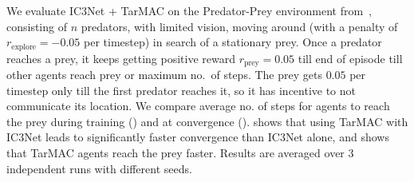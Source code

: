 We evaluate IC3Net + TarMAC on the Predator-Prey environment from~\citet{singh_iclr19},
consisting of $n$ predators, with limited vision, moving around
(with a penalty of $r_{\text{explore}}=-0.05$ per timestep)
in search of a stationary prey. Once a predator reaches a prey, it keeps getting positive
reward $r_{\text{prey}}=0.05$ till end of episode \ie till other agents reach prey or
maximum no.~of steps. The prey gets $0.05$ per timestep only till the first
predator reaches it, so it has incentive to not communicate its location.
We compare average no. of steps for
agents to reach the prey during training () and at convergence ().
 shows that using TarMAC with IC3Net leads to significantly faster convergence
than IC3Net alone, and  shows that TarMAC agents
reach the prey faster.
Results are averaged over $3$ independent runs with different seeds.



